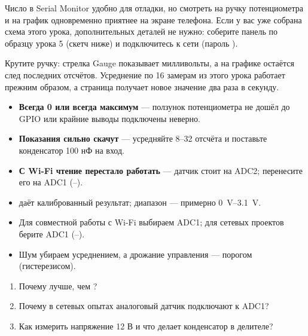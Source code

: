 Число в Serial Monitor удобно для отладки, но смотреть на ручку потенциометра и на график
одновременно приятнее на экране телефона. Если у вас уже собрана схема этого урока, дополнительных
деталей не нужно: соберите панель по образцу урока 5 (скетч ниже) и подключитесь к сети 
(пароль ).


Крутите ручку: стрелка Gauge показывает милливольты, а на графике остаётся след последних
отсчётов. Усреднение по 16 замерам из этого урока работает прежним образом, а страница
получает новое значение два раза в секунду.

\begin{trouble}
\begin{itemize}[leftmargin=*]
  \item \textbf{Всегда 0 или всегда максимум} --- ползунок потенциометра не дошёл до GPIO или крайние выводы подключены неверно.
  \item \textbf{Показания сильно скачут} --- усредняйте 8--32 отсчёта и поставьте конденсатор 100 нФ на вход.
  \item \textbf{С Wi-Fi чтение перестало работать} --- датчик стоит на ADC2; перенесите его на ADC1 (--).
\end{itemize}
\end{trouble}

\begin{summary}
\begin{itemize}[leftmargin=*]
  \item {} даёт калиброванный результат; диапазон --- примерно \SIrange{0}{3.1}{V}.
  \item Для совместной работы с Wi-Fi выбираем ADC1; для сетевых проектов берите ADC1 (--).
  \item Шум убираем усреднением, а дрожание управления --- порогом (гистерезисом).
\end{itemize}
\end{summary}

\begin{selfcheck}
\begin{enumerate}
  \item Почему  лучше, чем ?
  \item Почему в сетевых опытах аналоговый датчик подключают к ADC1?
  \item Как измерить напряжение 12 В и что делает конденсатор в делителе?
\end{enumerate}
\end{selfcheck}

